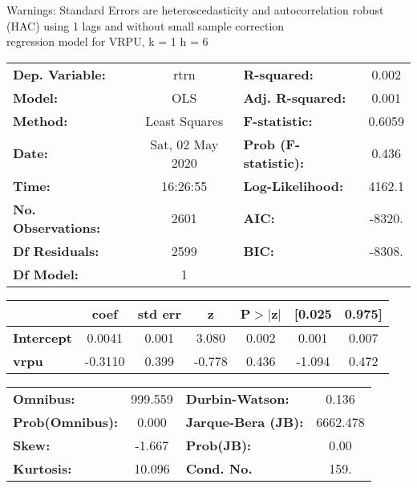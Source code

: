 Warnings: \newline
 [1] Standard Errors are heteroscedasticity and autocorrelation robust (HAC) using 1 lags and without small sample correction\\ 

regression model for VRPU, k = 1 h = 6\begin{center}
\begin{tabular}{lclc}
\toprule
\textbf{Dep. Variable:}    &       rtrn       & \textbf{  R-squared:         } &     0.002   \\
\textbf{Model:}            &       OLS        & \textbf{  Adj. R-squared:    } &     0.001   \\
\textbf{Method:}           &  Least Squares   & \textbf{  F-statistic:       } &    0.6059   \\
\textbf{Date:}             & Sat, 02 May 2020 & \textbf{  Prob (F-statistic):} &    0.436    \\
\textbf{Time:}             &     16:26:55     & \textbf{  Log-Likelihood:    } &    4162.1   \\
\textbf{No. Observations:} &        2601      & \textbf{  AIC:               } &    -8320.   \\
\textbf{Df Residuals:}     &        2599      & \textbf{  BIC:               } &    -8308.   \\
\textbf{Df Model:}         &           1      & \textbf{                     } &             \\
\bottomrule
\end{tabular}
\begin{tabular}{lcccccc}
                   & \textbf{coef} & \textbf{std err} & \textbf{z} & \textbf{P$> |$z$|$} & \textbf{[0.025} & \textbf{0.975]}  \\
\midrule
\textbf{Intercept} &       0.0041  &        0.001     &     3.080  &         0.002        &        0.001    &        0.007     \\
\textbf{vrpu}      &      -0.3110  &        0.399     &    -0.778  &         0.436        &       -1.094    &        0.472     \\
\bottomrule
\end{tabular}
\begin{tabular}{lclc}
\textbf{Omnibus:}       & 999.559 & \textbf{  Durbin-Watson:     } &    0.136  \\
\textbf{Prob(Omnibus):} &   0.000 & \textbf{  Jarque-Bera (JB):  } & 6662.478  \\
\textbf{Skew:}          &  -1.667 & \textbf{  Prob(JB):          } &     0.00  \\
\textbf{Kurtosis:}      &  10.096 & \textbf{  Cond. No.          } &     159.  \\
\bottomrule
\end{tabular}
\end{center}

